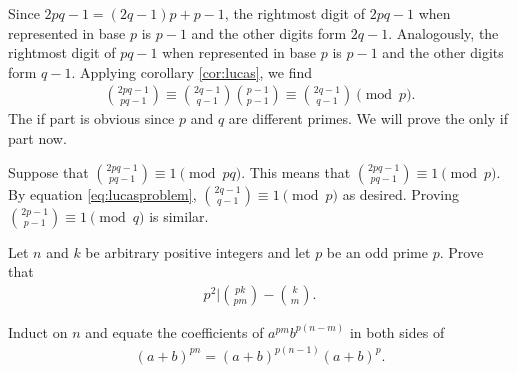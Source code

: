 \documentclass[12pt]{subfile}
\begin{document}
	\begin{solution}
		Since $2pq-1 = (2q-1)p+p-1$, the rightmost digit of $2pq-1$ when represented in base $p$ is $p-1$ and the other digits form $2q-1$. Analogously, the rightmost digit of $pq-1$ when represented in base $p$ is $p-1$ and the other digits form $q-1$. Applying corollary \eqref{cor:lucas}, we find
			\begin{align}
				\binom{2pq-1}{pq-1}\equiv \binom{2q-1}{q-1} \binom{p-1}{p-1}\equiv \binom{2q-1}{q-1} \pmod p.\label{eq:lucasproblem}
			\end{align}
		The if part is obvious since $p$ and $q$ are different primes. We will prove the only if part now. 
		
		Suppose  that $\binom{2pq-1}{pq-1}\equiv 1\pmod{pq}$. This means that $\binom{2pq-1}{pq-1}\equiv 1\pmod{p}$. By equation \eqref{eq:lucasproblem}, $\binom{2q-1}{q-1} \equiv 1 \pmod p$ as desired. Proving $\binom{2p-1}{p-1}\equiv 1 \pmod q$ is similar.
	\end{solution}
	
	\begin{problem}
		Let $n$ and $k$ be arbitrary positive integers and let $p$ be an odd prime $p$. Prove that 
			\begin{align*}
				p^2 \Big| \binom{pk}{pm} - \binom{k}{m}.
			\end{align*}
	\end{problem}
	
	\begin{hint}
		Induct on $n$ and equate the coefficients of $a^{pm}b^{p(n-m)}$ in both sides of
			\begin{align*}
				(a+b)^{pn}=(a+b)^{p(n-1)}(a+b)^{p}.
			\end{align*}
	\end{hint}
	
	
%		
	
\end{document}
